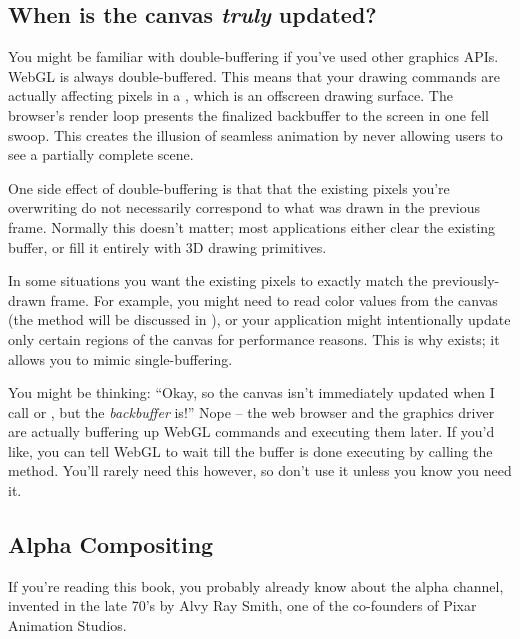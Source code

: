 \subsection{When is the canvas \emph{truly} updated?}
\label{sec:doublebuffer}

You might be familiar with  double-buffering if you've used other graphics APIs.  WebGL is always double-buffered.  This means that your drawing commands are actually affecting pixels in a  , which is an offscreen drawing surface.  The browser's render loop presents the finalized backbuffer to the screen in one fell swoop.  This creates the illusion of seamless animation by never allowing users to see a partially complete scene.

One side effect of double-buffering is that that the existing pixels you're overwriting do not necessarily correspond to what was drawn in the previous frame.  Normally this doesn't matter; most applications either clear the existing buffer, or fill it entirely with 3D drawing primitives.

In some situations you want the existing pixels to exactly match the previously-drawn frame.  For example, you might need to read color values from the canvas (the   method will be discussed in ), or your application might intentionally update only certain regions of the canvas for performance reasons.  This is why  exists; it allows you to mimic  single-buffering.

You might be thinking: ``Okay, so the canvas isn't immediately updated when I call  or , but the \emph{backbuffer} is!''  Nope -- the web browser and the graphics driver are actually buffering up WebGL commands and executing them later.  If you'd like, you can tell WebGL to wait till the buffer is done executing by calling the   method.  You'll rarely need this however, so don't use it unless you know you need it.

\subsection{Alpha Compositing}

If you're reading this book, you probably already know about the alpha channel, invented in the late 70's by Alvy Ray Smith, one of the co-founders of Pixar Animation Studios.


